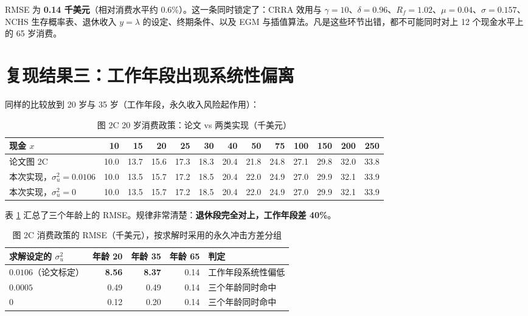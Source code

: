 \documentclass[UTF8,a4paper,11pt,fontset=fandol]{ctexart}
\newcommand{\su}{\sigma_u^2}
\begin{document}
RMSE 为 \textbf{0.14 千美元}（相对消费水平约 0.6\%）。这一条同时锁定了：CRRA 效用与 \(\gamma=10\)、\(\delta=0.96\)、\(R_f=1.02\)、\(\mu=0.04\)、\(\sigma=0.157\)、NCHS 生存概率表、退休收入 \(y=\lambda\) 的设定、终期条件、以及 EGM 与插值算法。凡是这些环节出错，都不可能同时对上 12 个现金水平上的 65 岁消费。

\section{复现结果三：工作年段出现系统性偏离}

同样的比较放到 20 岁与 35 岁（工作年段，永久收入风险起作用）：

\begin{table}[htbp]\centering\small
\caption{图 2C 20 岁消费政策：论文 vs 两类实现（千美元）}\vspace{-2pt}
\begin{tabular}{@{}lrrrrrrrrrrrr@{}}\toprule
现金 \(x\) & 10 & 15 & 20 & 25 & 30 & 40 & 50 & 75 & 100 & 150 & 200 & 250\\\midrule
论文图 2C & 10.0 & 13.7 & 15.6 & 17.3 & 18.3 & 20.4 & 21.8 & 24.8 & 27.1 & 29.8 & 32.0 & 33.8\\
本次实现，\(\su=0.0106\) & 10.0 & 13.5 & 15.7 & 17.2 & 18.5 & 20.4 & 22.0 & 24.9 & 27.0 & 29.9 & 32.1 & 33.9\\
本次实现，\(\su=0\) & 10.0 & 13.5 & 15.7 & 17.2 & 18.5 & 20.4 & 22.0 & 24.9 & 27.0 & 29.9 & 32.1 & 33.9\\\bottomrule
\end{tabular}
\end{table}

表 \ref{tab:fig2c-rmse} 汇总了三个年龄上的 RMSE。规律非常清楚：\textbf{退休段完全对上，工作年段差 40\%}。

\begin{table}[htbp]\centering\small
\caption{图 2C 消费政策的 RMSE（千美元），按求解时采用的永久冲击方差分组}\label{tab:fig2c-rmse}\vspace{-2pt}
\begin{tabular}{@{}lrrrp{}@{}}\toprule
求解设定的 \(\su\) & 年龄 20 & 年龄 35 & 年龄 65 & 判定\\\midrule
\(0.0106\)（论文标定） & \textbf{8.56} & \textbf{8.37} & 0.14 & 工作年段系统性偏低\\
\(0.0005\) & 0.49 & 0.49 & 0.14 & 三个年龄同时命中\\
\(0\) & 0.12 & 0.20 & 0.14 & 三个年龄同时命中\\
\bottomrule
\end{tabular}
\end{table}
\end{document}
